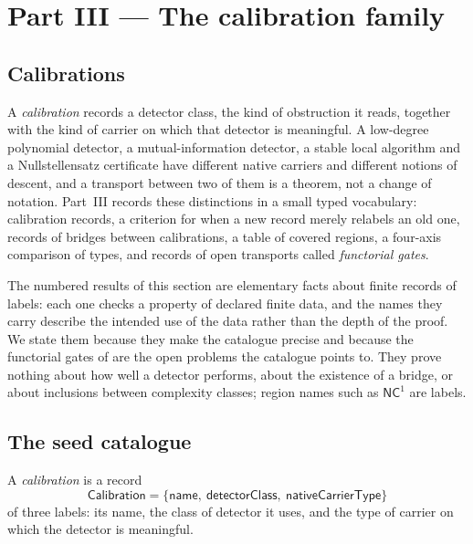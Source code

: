 \section{Part III --- The calibration family}\label{sec:calibration}

\subsection{Calibrations}\label{sec:calibration:intro}

A \emph{calibration} records a detector class, the kind of obstruction
it reads, together with the kind of carrier on which that detector is
meaningful.  A low-degree polynomial detector, a mutual-information
detector, a stable local algorithm and a Nullstellensatz certificate
have different native carriers and different notions of descent, and a
transport between two of them is a theorem, not a change of notation.
Part~III records these distinctions in a small typed vocabulary:
calibration records, a criterion for when a new record merely relabels
an old one, records of bridges between calibrations, a table of covered
regions, a four-axis comparison of types, and records of open
transports called \emph{functorial gates}.

The numbered results of this section are elementary facts about
finite records of labels: each one checks a property of declared finite
data, and the names they carry describe the intended use of the data
rather than the depth of the proof.  We state them because they make the catalogue precise and
because the functorial gates of 
are the open problems the catalogue points to.  They prove nothing
about how well a detector performs, about the existence of a bridge, or
about inclusions between complexity classes; region names such as
\(\mathsf{NC}^{1}\) are labels.

\subsection{The seed catalogue}\label{sec:calibration:structure}

\begin{definition}[Calibration]\label{def:calibration}
A \emph{calibration} is a record
\[
  \mathsf{Calibration}
  =
  \{\mathsf{name},\ \mathsf{detectorClass},\ \mathsf{nativeCarrierType}\}
\]
of three labels: its name, the class of detector it uses, and the type
of carrier on which the detector is meaningful.
\end{definition}


